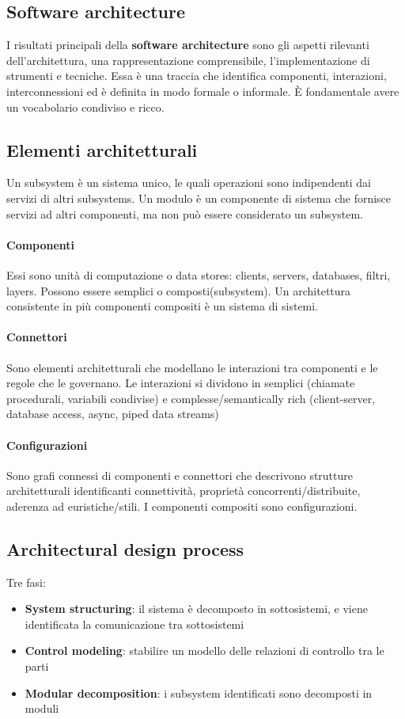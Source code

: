 \documentclass[11pt]{article}
\begin{document}
\subsection{Software architecture}
I risultati principali della \textbf{software architecture} sono gli aspetti rilevanti dell'architettura, una rappresentazione comprensibile, l'implementazione di strumenti e tecniche. Essa è una traccia che identifica componenti, interazioni, interconnessioni ed è definita in modo formale o informale. È fondamentale avere un vocabolario condiviso e ricco. 
\subsection{Elementi architetturali}
Un subsystem è un sistema unico, le quali operazioni sono indipendenti dai servizi di altri subsystems. Un modulo è un componente di sistema che fornisce servizi ad altri componenti, ma non può essere considerato un subsystem.
\paragraph{Componenti} Essi sono unità di computazione o data stores: clients, servers, databases, filtri, layers. Possono essere semplici o composti(subsystem). Un architettura consistente in più componenti compositi è un sistema di sistemi. 
\paragraph{Connettori} Sono elementi architetturali che modellano le interazioni tra componenti e le regole che le governano. Le interazioni si dividono in semplici (chiamate procedurali, variabili condivise) e complesse/semantically rich (client-server, database access, async, piped data streams)
\paragraph{Configurazioni} Sono grafi connessi di componenti e connettori che descrivono strutture architetturali identificanti connettività, proprietà concorrenti/distribuite, aderenza ad euristiche/stili. I componenti compositi sono configurazioni.
\subsection{Architectural design process}
Tre fasi:
\begin{itemize}
    \item \textbf{System structuring}: il sistema è decomposto in sottosistemi, e viene identificata la comunicazione tra sottosistemi
    \item \textbf{Control modeling}: stabilire un modello delle relazioni di controllo tra le parti 
    \item \textbf{Modular decomposition}: i subsystem identificati sono decomposti in moduli 
\end{itemize}
\end{document}
